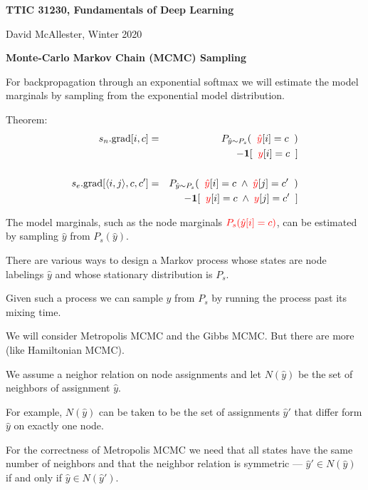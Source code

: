 




{\Huge

  \centerline{\bf TTIC 31230, Fundamentals of Deep Learning}
  \bigskip
  \centerline{David McAllester, Winter 2020}
  \vfill
  \vfill
  \centerline{\bf Monte-Carlo Markov Chain (MCMC) Sampling}
\vfill
\vfill
\vfill


For backpropagation through an exponential softmax we will estimate the model marginals by sampling from the exponential model distribution.

Theorem:
\begin{eqnarray*}
    s_n.\mathrm{grad}[i,c] & = &   P_{\hat{y} \sim P_s}(\;\;{\color{red} \hat{y}}[i] = c\;\;) \\
    & & \;\;\;\;\;- \mathbf{1}[\;\;{\color{red} y}[i] = c\;\;] \\
    \\
    s_e.\mathrm{grad}[{\mbox{$\langle i,j\rangle$}},c,c'] & = &  P_{\hat{y} \sim P_s}(\;\;{\color{red} \hat{y}}[i] = c \; \wedge \; {\color{red} \hat{y}}[j] = c'\;\;) \\
    & & \;\;\;\;\;- \mathbf{1}[\;\;{\color{red} y}[i] = c\; \wedge \; {\color{red} y}[j] =
    c'\;\;]
\end{eqnarray*}

The model marginals, such as the node marginals
 ${\color{red} P_s(\hat{y}[i]=c)}$, can be estimated by sampling $\hat{y}$ from $P_s(\hat{y})$.

\vfill
There are various ways to design a Markov process whose states are node labelings $\hat{y}$ and whose stationary distribution is $P_s$.

\vfill
Given such a process we can sample $\hat{y}$ from $P_s$ by running the process past its mixing time.

\vfill
We will consider Metropolis MCMC and the Gibbs MCMC.  But there are more (like Hamiltonian MCMC).


We assume a neighor relation on node assignments and let $N(\hat{y})$ be the set of neighbors of assignment $\hat{y}$.

\vfill
For example, $N(\hat{y})$ can be taken to be the set of assignments $\hat{y}'$ that differ form $\hat{y}$ on exactly one node.

\vfill
For the correctness of Metropolis MCMC we need that all states have the same number of neighbors and that the neighbor relation is symmetric ---
$\hat{y}' \in N(\hat{y})$ if and only if $\hat{y} \in N(\hat{y}')$.

}

